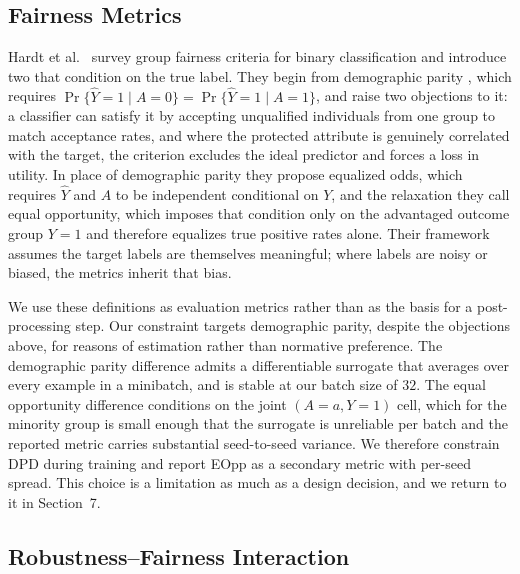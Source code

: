\documentclass[11pt]{article}
\begin{document}
\subsection{Fairness Metrics}

Hardt et al.\ \cite{hardt2016} survey group fairness criteria for binary
classification and introduce two that condition on the true label. They begin from
demographic parity \cite{hardt2016}, which requires
$\Pr\{\hat{Y}=1 \mid A=0\} = \Pr\{\hat{Y}=1 \mid A=1\}$, and raise two objections to
it: a classifier can satisfy it by accepting unqualified individuals from one group
to match acceptance rates, and where the protected attribute is genuinely correlated
with the target, the criterion excludes the ideal predictor and forces a loss in
utility. In place of demographic parity they propose equalized odds, which requires
$\hat{Y}$ and $A$ to be independent conditional on $Y$, and the relaxation they call
equal opportunity, which imposes that condition only on the advantaged outcome group
$Y=1$ and therefore equalizes true positive rates alone. Their framework assumes the
target labels are themselves meaningful; where labels are noisy or biased, the
metrics inherit that bias.

We use these definitions as evaluation metrics rather than as the basis for a
post-processing step. Our constraint targets demographic parity, despite the
objections above, for reasons of estimation rather than normative preference. The
demographic parity difference admits a differentiable surrogate that averages over
every example in a minibatch, and is stable at our batch size of $32$. The equal
opportunity difference conditions on the joint $(A=a, Y=1)$ cell, which for the
minority group is small enough that the surrogate is unreliable per batch and the
reported metric carries substantial seed-to-seed variance. We therefore constrain
DPD during training and report EOpp as a secondary metric with per-seed spread. This
choice is a limitation as much as a design decision, and we return to it in
Section~7.

\subsection{Robustness--Fairness Interaction}
\end{document}
